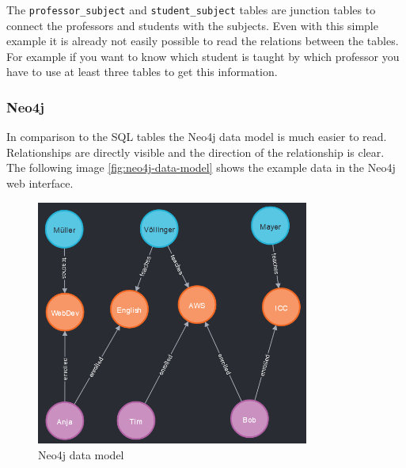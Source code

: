 The \texttt{professor\_subject} and \texttt{student\_subject} tables are
junction tables to connect the professors and students with the subjects. Even
with this simple example it is already not easily possible to read the relations
between the tables. For example if you want to know which student is taught by
which professor you have to use at least three tables to get this information.

\subsubsection{Neo4j}
In comparison to the SQL tables the Neo4j data model is much easier to read.
Relationships are directly visible and the direction of the relationship is
clear. The following image \autoref{fig:neo4j-data-model} shows the
example data in the Neo4j web interface.

\begin{figure}[ht]
    \centering
    \includegraphics[width=0.8\textwidth]{images/neo4j-data-model.png}
    \caption{Neo4j data model}
    \label{fig:neo4j-data-model}
\end{figure}